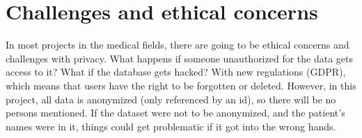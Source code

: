 \section{Challenges and ethical concerns}
In most projects in the medical fields, there are going to be ethical concerns and challenges with privacy. What happens if someone unauthorized for the data gets access to it? What if the database gets hacked? With new regulations (GDPR), which means that users have the right to be forgotten or deleted. However, in this project, all data is anonymized (only referenced by an id), so there will be no persons mentioned. If the dataset were not to be anonymized, and the patient's names were in it, things could get problematic if it got into the wrong hands. 



